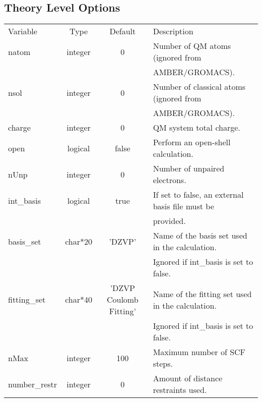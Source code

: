 \documentclass[journal=jctcce,manuscript=article]{achemso}
\begin{document}
    \subsection{Theory Level Options}
    \begin{table}  [H]
      \begin{center}
      \begin{tabular}{ l c c l}
         Variable & Type & Default & Description \\
         natom & integer & 0 & Number of QM atoms (ignored from \\
            & & & AMBER/GROMACS). \\
         nsol & integer & 0 & Number of classical atoms (ignored from \\
            & & & AMBER/GROMACS). \\
         charge & integer & 0 & QM system total charge. \\
         open & logical & false & Perform an open-shell calculation. \\
         nUnp & integer & 0 & Number of unpaired electrons. \\
         int\_basis & logical & true & If set to false, an external basis file must be \\ 
            & & & provided. \\
         basis\_set & char*20 & 'DZVP' & Name of the basis set used in the calculation. \\
            & & & Ignored if int\_basis is set to false. \\
         fitting\_set & char*40 & 'DZVP Coulomb Fitting' & Name of the fitting set used in the calculation. \\
            & & & Ignored if int\_basis is set to false. \\
         nMax & integer & 100 & Maximum number of SCF steps. \\
         number\_restr & integer & 0 & Amount of distance restraints used. \\
      \end{tabular}
       \end{center}
      \label{lio.theory.var}
    \end{table}  
    
\end{document}
